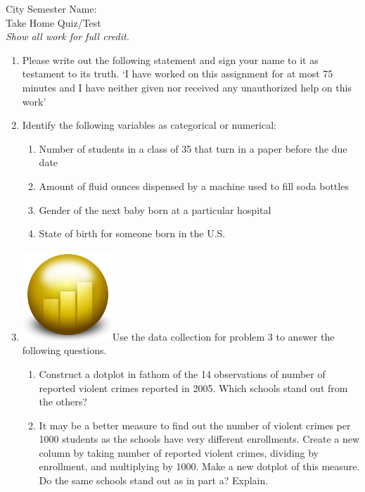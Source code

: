 \documentclass[12pt]{article}
\theoremstyle{plain}     %
\begin{document}
\large
City Semester  \hspace{8cm} Name:\makebox[6cm]{\hrulefill}
\\
Take Home Quiz/Test\\
\normalsize 
\emph{Show all work for full credit.}\\
\begin{enumerate}
	\item Please write out the following statement and sign your name to it as testament to its truth. `I have worked on this assignment for at most 75 minutes and I have neither given nor received any unauthorized help on this work'\\[2cm]
	\item Identify the following variables as categorical or numerical:
		\begin{enumerate}
			\item Number of students in a class of 35 that turn in a paper before the due date\\
			\item Amount of fluid ounces dispensed by a machine used to fill soda bottles\\
			\item Gender of the next baby born at a particular hospital\\
			\item State of birth for someone born in the U.S.	\\
		\end{enumerate}
	\item \includegraphics[scale=.1]{fathom.png}Use the data collection for problem 3 to answer the following questions.
		\begin{enumerate}
			\item Construct a dotplot in fathom of the 14 observations of number of reported violent crimes reported in 2005. Which schools stand out from the others?\\[1.5cm]
			
			\item It may be a better measure to find out the number of violent crimes per 1000 students as the schools have very different enrollments. Create a new column by taking number of reported violent crimes, dividing by enrollment, and multiplying by 1000. Make a new dotplot of this measure. Do the same schools stand out as in part a? Explain.\\[1.5cm]
\newpage
			

\end{enumerate}
\end{enumerate}
\end{document}
